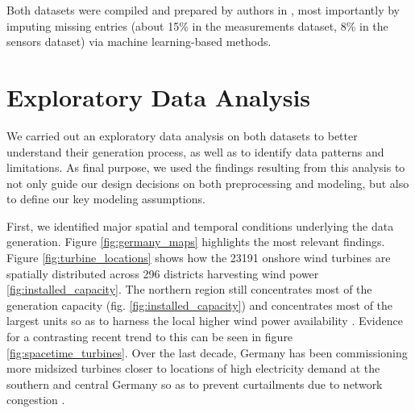 Both datasets were compiled and prepared by authors in \cite{becker2017completion}, most importantly by imputing missing entries (about 15\% in the measurements dataset, 8\% in the sensors dataset) via machine learning-based methods.

\section{Exploratory Data Analysis}\label{sec:eda}
We carried out an exploratory data analysis on both datasets to better understand their generation process, as well as to identify data patterns and limitations.
As final purpose, we used the findings resulting from this analysis to not only guide our design decisions on both preprocessing and modeling, but also to define our key modeling assumptions.

First, we identified major spatial and temporal conditions underlying the data generation.
Figure \ref{fig:germany_maps} highlights the most relevant findings.
Figure \ref{fig:turbine_locations} shows how the 23191 onshore wind turbines are spatially distributed across 296 districts harvesting wind power \ref{fig:installed_capacity}.
The northern region still concentrates most of the generation capacity (fig. \ref{fig:installed_capacity}) and concentrates most of the largest units so as to harness the local higher wind power availability \cite{windatlas}.
Evidence for a contrasting recent trend to this can be seen in figure \ref{fig:spacetime_turbines}.
Over the last decade, Germany has been commissioning more midsized turbines closer to locations of high electricity demand at the southern and central Germany so as to prevent curtailments due to network congestion \cite{engeland2017variability}.

